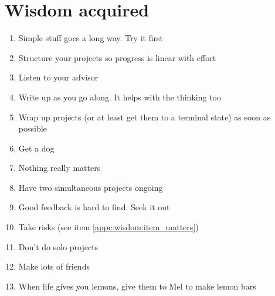 \graphicspath{{../Thesis/Appendix/appendix_wisdom/}}

\chapter{Wisdom acquired}
\label{app:wisdom}

\begin{enumerate}
	\item Simple stuff goes a long way. Try it first
	\item Structure your projects so progress is linear with effort
	\item Listen to your advisor
	\item Write up as you go along. It helps with the thinking too
	\item Wrap up projects (or at least get them to a terminal state) as soon as possible
	\item Get a dog
	\item Nothing really matters \label{appc:wisdom:item_matters}
	\item Have two simultaneous projects ongoing
	\item Good feedback is hard to find. Seek it out
	\item Take risks (see item \ref{appc:wisdom:item_matters})
	\item Don't do solo projects
	\item Make lots of friends
	\item When life gives you lemons, give them to Mel to make lemon bars
\end{enumerate}